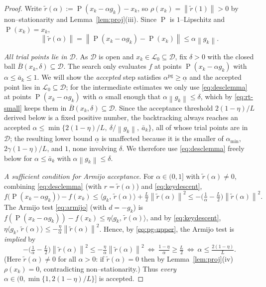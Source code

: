 \documentclass[12pt]{article}
\DeclareMathOperator{\proj}{P}
\newcommand{\norm}[1]{\left\lVert #1 \right\rVert}
\newcommand{\inner}[2]{\langle #1,\, #2\rangle}
\begin{document}
\begin{proof}
Write $\widetilde r(\alpha):=\proj(x_k-\alpha g_k)-x_k$, so
$\rho(x_k)=\norm{\widetilde r(1)}>0$ by non--stationarity and
Lemma~\ref{lem:proj}(iii). Since $\proj$ is $1$--Lipschitz and
$\proj(x_k)=x_k$,
\begin{equation}\label{eq:rt-small}
\norm{\widetilde r(\alpha)}=\norm{\proj(x_k-\alpha g_k)-\proj(x_k)}
\le\alpha\norm{g_k}.
\end{equation}

\emph{All trial points lie in $\mathcal D$.} As $\mathcal D$ is open and
$x_k\in\mathcal L_0\subseteq\mathcal D$, fix $\delta>0$ with the closed ball
$\overline B(x_k,\delta)\subseteq\mathcal D$. The search only evaluates $f$ at
points $\proj(x_k-\alpha g_k)$ with $\alpha\le\bar a_k\le1$. We will show the
\emph{accepted} step satisfies $\alpha^{\mathrm{pg}}\ge\underline\alpha$ and the
accepted point lies in $\mathcal L_0\subseteq\mathcal D$; for the intermediate
estimates we only use \eqref{eq:desclemma} at points
$\proj(x_k-\alpha g_k)$ with $\alpha$ small enough that
$\alpha\norm{g_k}\le\delta$, which by \eqref{eq:rt-small} keeps them in
$\overline B(x_k,\delta)\subseteq\mathcal D$. Since the acceptance threshold
$2(1-\eta)/L$ derived below is a fixed positive number, the backtracking always
reaches an accepted $\alpha\le\min\{2(1-\eta)/L,\ \delta/\norm{g_k},\ \bar a_k\}$,
all of whose trial points are in $\mathcal D$; the resulting lower bound
$\underline\alpha$ is unaffected because it is the smaller of $\alpha_{\min}$,
$2\gamma(1-\eta)/L$, and $1$, none involving $\delta$. We therefore use
\eqref{eq:desclemma} freely below for $\alpha\le\bar a_k$ with
$\alpha\norm{g_k}\le\delta$.

\emph{A sufficient condition for Armijo acceptance.} For $\alpha\in(0,1]$ with
$\widetilde r(\alpha)\neq0$, combining \eqref{eq:desclemma} (with
$r=\widetilde r(\alpha)$) and \eqref{eq:keydescent},
\begin{equation}\label{eq:pg-upper}
f\big(\proj(x_k-\alpha g_k)\big)-f(x_k)
\le\inner{g_k}{\widetilde r(\alpha)}+\tfrac{L}{2}\norm{\widetilde r(\alpha)}^2
\le-\Big(\tfrac1\alpha-\tfrac L2\Big)\norm{\widetilde r(\alpha)}^2 .
\end{equation}
The Armijo test \eqref{eq:armijo} (with $d=-g_k$) is
$f(\proj(x_k-\alpha g_k))-f(x_k)\le\eta\inner{g_k}{\widetilde r(\alpha)}$, and by
\eqref{eq:keydescent}, $\eta\inner{g_k}{\widetilde r(\alpha)}\le
-\tfrac{\eta}{\alpha}\norm{\widetilde r(\alpha)}^2$. Hence, by
\eqref{eq:pg-upper}, the Armijo test is \emph{implied} by
\[
-\Big(\tfrac1\alpha-\tfrac L2\Big)\norm{\widetilde r(\alpha)}^2
\le-\tfrac{\eta}{\alpha}\norm{\widetilde r(\alpha)}^2
\ \Longleftrightarrow\
\tfrac{1-\eta}{\alpha}\ge\tfrac L2
\ \Longleftrightarrow\
\alpha\le\tfrac{2(1-\eta)}{L}.
\]
(Here $\widetilde r(\alpha)\neq0$ for all $\alpha>0$: if $\widetilde r(\alpha)=0$
then by Lemma~\ref{lem:proj}(iv) $\rho(x_k)=0$, contradicting
non--stationarity.) Thus \emph{every} $\alpha\in(0,\min\{1,2(1-\eta)/L\}]$ is
accepted.


\end{proof}
\end{document}
